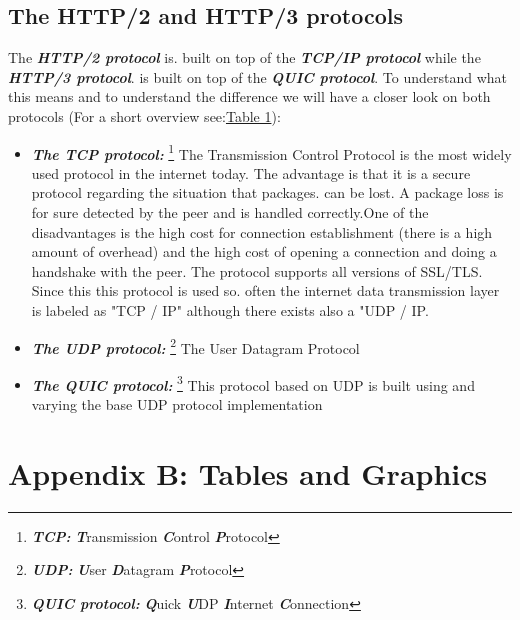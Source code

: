 \documentclass[10pt,a4paper,english]{article}
\newcommand{\abbrhighcol}[1]{\textbf{\textit{#1}}}
\begin{document}
\begin{multicols}{2}
\begin{flushleft}
\end{flushleft}
\subsection{The HTTP/2 and HTTP/3 protocols}
\begin{flushleft}
The \abbrhighcol {HTTP/2 protocol} is. built on top of the \abbrhighcol {TCP/IP protocol} while the \abbrhighcol {HTTP/3 protocol}. is built on top of the \abbrhighcol{QUIC protocol}.
To understand what this means and to understand the difference we will have a closer look on both protocols (For a short overview see:\hyperref[tab:TCPvsUDP]{Table 1}): 
\begin{itemize}
\item{\abbrhighcol {The TCP protocol:} \footnote{\abbrhighcol {TCP: } \abbrhighcol {T}ransmission \abbrhighcol {C}ontrol \abbrhighcol {P}rotocol} The Transmission Control Protocol is the most widely used protocol in the internet today. \newline The advantage is that it is a  secure protocol regarding the situation that packages. can be lost. A package loss is for sure detected by the peer and is handled correctly.\newline One of the disadvantages is the high cost for connection establishment (there is a high amount of overhead) and the high cost of opening a connection and doing a handshake with the peer. The protocol supports all versions of SSL/TLS. Since this this protocol is used so. often the internet data transmission layer is labeled as "TCP / IP" although there exists also a "UDP / IP.} 
\item{\abbrhighcol{The UDP protocol:} \footnote{\abbrhighcol{UDP: }\abbrhighcol{U}ser \abbrhighcol{D}atagram \abbrhighcol{P}rotocol} The User Datagram Protocol}
\item{\abbrhighcol{The QUIC protocol:} \footnote{\abbrhighcol {QUIC protocol:} \abbrhighcol{Q}uick \abbrhighcol {U}DP \abbrhighcol{I}nternet \abbrhighcol{C}onnection} This protocol based on UDP is built using and varying the base UDP protocol implementation }
\end{itemize}
\end{flushleft}
\end{multicols}
\section{Appendix B: Tables and Graphics}
\end{document}
